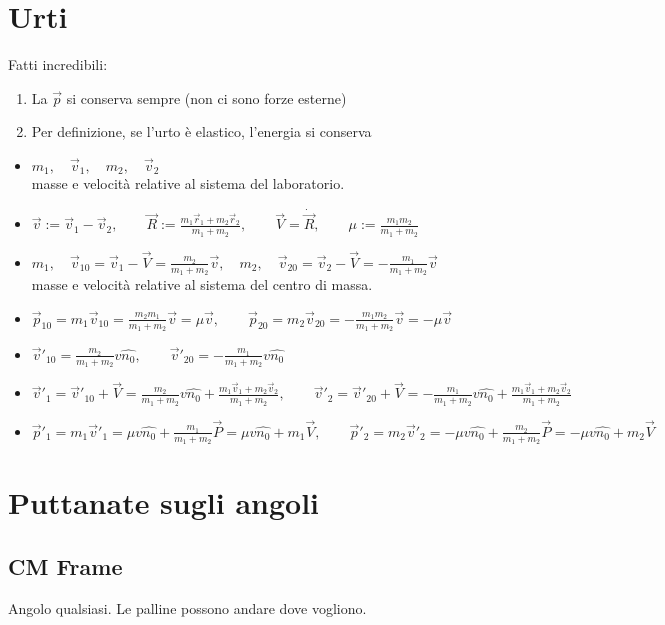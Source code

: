 \documentclass[a4paper,NoNotes,GeneralMath,12pt]{stdmdoc}
\begin{document}
	\section*{Urti}
	Fatti incredibili:
	\begin{enumerate}
		\item La $\vec{p}$ si conserva sempre (non ci sono forze esterne)
		\item Per definizione, se l'urto è elastico, l'energia si conserva
	\end{enumerate}
	\begin{itemize}
		\item $m_1, \quad \vec{v}_1, \quad m_2, \quad \vec{v}_2$ \\ masse e velocità relative al sistema del laboratorio.
		\item $\vec{v} := \vec{v}_1 - \vec{v}_2, \qquad \vec{R} := \frac{m_1\vec{r}_1 + m_2\vec{r}_2}{m_1 + m_2}, \qquad \vec{V} = \dot{\vec{R}}, \qquad \mu := \frac{m_1m_2}{m_1+m_2}$
		\item $m_1, \quad \vec{v}_{10} = \vec{v}_1 - \vec{V} = \frac{m_2}{m_1 + m_2} \vec{v}, \quad m_2, \quad \vec{v}_{20} = \vec{v}_2 - \vec{V} = -\frac{m_1}{m_1 + m_2} \vec{v}$ \\ masse e velocità relative al sistema del centro di massa.
		\item $\vec{p}_{10} = m_1 \vec{v}_{10} = \frac{m_2m_1}{m_1 + m_2} \vec{v} = \mu \vec{v}, \qquad \vec{p}_{20} = m_2 \vec{v}_{20} = -\frac{m_1m_2}{m_1 + m_2} \vec{v} = - \mu \vec{v}$
		\item $\vec{v}'_{10} = \frac{m_2}{m_1 + m_2} v \hat{n_0}, \qquad \vec{v}'_{20} = - \frac{m_1}{m_1 + m_2} v \hat{n_0}$
		\item $\vec{v}'_1 = \vec{v}'_{10} + \vec{V} = \frac{m_2}{m_1 + m_2} v \hat{n_0} + \frac{m_1\vec{v}_1 + m_2 \vec{v}_2}{m_1 + m_2}, \qquad \vec{v}'_2 = \vec{v}'_{20} + \vec{V} = - \frac{m_1}{m_1 + m_2} v \hat{n_0} + \frac{m_1\vec{v}_1 + m_2\vec{v}_2}{m_1 + m_2}$
		\item $\vec{p}'_1 = m_1\vec{v}'_1 = \mu v \hat{n_0} + \frac{m_1}{m_1 + m_2} \vec{P} = \mu v \hat{n_0} + m_1 \vec{V}, \qquad \vec{p}'_2 = m_2 \vec{v}'_2 = - \mu v \hat{n_0} + \frac{m_2}{m_1+m_2} \vec{P} = - \mu v \hat{n_0} + m_2 \vec{V}$
	\end{itemize}

	\section*{Puttanate sugli angoli}
	\subsection*{CM Frame}
	Angolo qualsiasi. Le palline possono andare dove vogliono.
\end{document}

